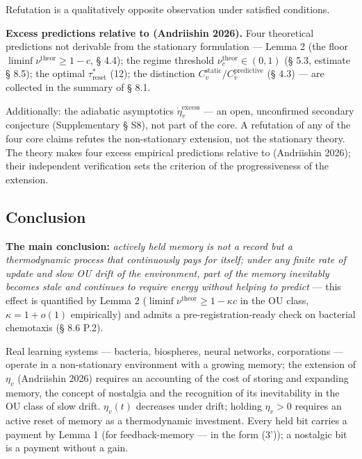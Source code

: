\documentclass[pdflatex,sn-mathphys-ay]{sn-jnl}
\begin{document}
Refutation is a qualitatively opposite observation under satisfied conditions.



\textbf{Excess predictions relative to (Andriishin 2026).} Four theoretical predictions not derivable from the stationary formulation --- Lemma 2 (the floor \(\liminf \nu^{\text{theor}} \ge 1-c\), § 4.4); the regime threshold \(\nu_c^{\text{theor}} \in (0,1)\) (§ 5.3, estimate § 8.5); the optimal \(\tau_{\text{reset}}^*\) (12); the distinction \(C_v^{\text{static}}/C_v^{\text{predictive}}\) (§ 4.3) --- are collected in the summary of § 8.1.



Additionally: the adiabatic asymptotics \(\dot\eta_v^{\text{excess}}\) --- an open, unconfirmed secondary conjecture (Supplementary § S8), not part of the core. A refutation of any of the four core claims refutes the non-stationary extension, not the stationary theory. The theory makes four excess empirical predictions relative to (Andriishin 2026); their independent verification sets the criterion of the progressiveness of the extension.



\subsection{Conclusion}\label{conclusion}



\textbf{The main conclusion:} \emph{actively held memory is not a record but a thermodynamic process that continuously pays for itself; under any finite rate of update and slow OU drift of the environment, part of the memory inevitably becomes stale and continues to require energy without helping to predict} --- this effect is quantified by Lemma 2 (\(\liminf \nu^{\text{theor}} \ge 1 - \kappa c\) in the OU class, \(\kappa = 1 + o(1)\) empirically) and admits a pre-registration-ready check on bacterial chemotaxis (§ 8.6 P.2).



Real learning systems --- bacteria, biospheres, neural networks, corporations --- operate in a non-stationary environment with a growing memory; the extension of \(\eta_v\) (Andriishin 2026) requires an accounting of the cost of storing and expanding memory, the concept of nostalgia and the recognition of its inevitability in the OU class of slow drift. \(\eta_v(t)\) decreases under drift; holding \(\eta_v > 0\) requires an active reset of memory as a thermodynamic investment. Every held bit carries a payment by Lemma 1 (for feedback-memory --- in the form (3')); a nostalgic bit is a payment without a gain.
\end{document}
